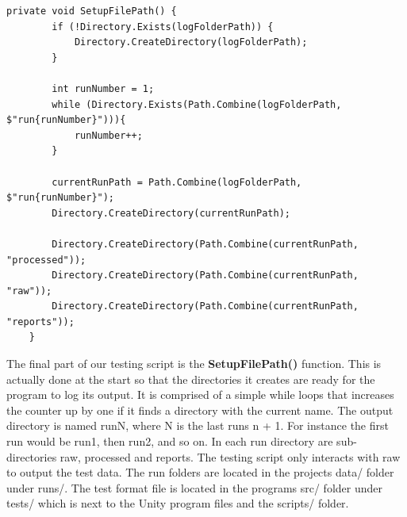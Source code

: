 \documentclass{l4proj}
\begin{document}
\begin{lstlisting}[language={[Sharp]C}, float=h!, caption={Exert from the testin script showcasing how output logs are structured.}]
    private void SetupFilePath() {
        if (!Directory.Exists(logFolderPath)) {
            Directory.CreateDirectory(logFolderPath);
        }

        int runNumber = 1;
        while (Directory.Exists(Path.Combine(logFolderPath, $"run{runNumber}"))){
            runNumber++;
        }

        currentRunPath = Path.Combine(logFolderPath, $"run{runNumber}");
        Directory.CreateDirectory(currentRunPath);

        Directory.CreateDirectory(Path.Combine(currentRunPath, "processed"));
        Directory.CreateDirectory(Path.Combine(currentRunPath, "raw"));
        Directory.CreateDirectory(Path.Combine(currentRunPath, "reports"));
    }
\end{lstlisting} \label{file-setup-implemtation}
The final part of our testing script is the \textbf{SetupFilePath()} function. This is actually done at the start so that the directories it creates are ready for the program to log its output. It is comprised of a simple while loops that increases the counter up by one if it finds a directory with the current name. The output directory is named runN, where N is the last runs n + 1. For instance the first run would be run1, then run2, and so on. In each run directory are sub-directories raw, processed and reports. The testing script only interacts with raw to output the test data. The run folders are located in the projects data/ folder under runs/. The test format file is located in the programs src/ folder under tests/ which is next to the Unity program files and the scripts/ folder.
\end{document}

